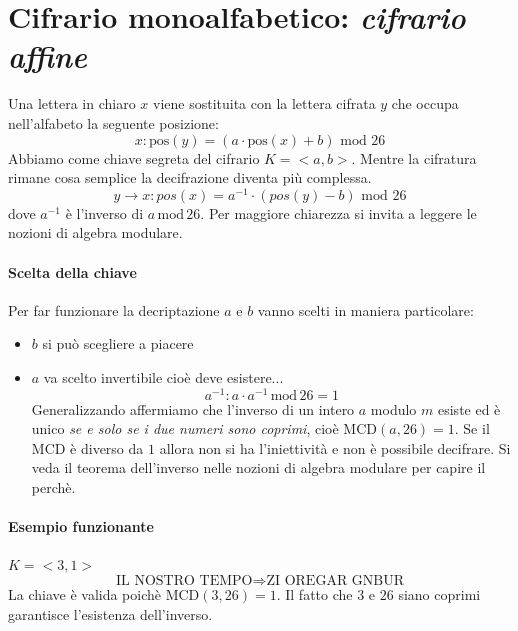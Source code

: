\section{Cifrario monoalfabetico: \emph{cifrario affine}}
Una lettera in chiaro $x$ viene sostituita con la lettera cifrata $y$ che occupa nell'alfabeto la seguente posizione:
$$x: \text{pos}\left(y\right) = \left(a \cdot \text{pos}\left(x\right) + b\right)\text{ mod } 26 $$
Abbiamo come chiave segreta del cifrario $K = <a, b>$. Mentre la cifratura rimane cosa semplice la decifrazione diventa più complessa. 
$$ y \xrightarrow{} x : pos\left(x\right) = a^{-1} \cdot (pos\left(y\right) - b) \text{ mod } 26 $$
dove $a^{-1}$ è l'inverso di $a\,\text{mod}\,26$. Per maggiore chiarezza si invita a leggere le nozioni di algebra modulare.
\paragraph{Scelta della chiave} Per far funzionare la decriptazione $a$ e $b$ vanno scelti in maniera particolare:
\begin{itemize}
	\item $b$ si può scegliere a piacere
    \item $a$ va scelto invertibile cioè deve esistere...
    \[a^{-1} : a \cdot a^{-1} \,\text{mod}\, 26 = 1\]
    Generalizzando affermiamo che l'inverso di un intero $a$ modulo $m$ esiste ed è unico \emph{se e solo se i due numeri sono coprimi}, cioè $\text{MCD}(a, 26) = 1$. Se il MCD è diverso da $1$ allora non si ha l'iniettività e non è possibile decifrare. Si veda il teorema dell'inverso nelle nozioni di algebra modulare per capire il perchè.
\end{itemize}
\paragraph{Esempio funzionante} $K=<3,1>$
$$\text{IL NOSTRO TEMPO} \Longrightarrow \text{ZI OREGAR GNBUR}$$
La chiave è valida poichè $\text{MCD}(3,26)=1$. Il fatto che $3$ e $26$ siano coprimi garantisce l'esistenza dell'inverso.

